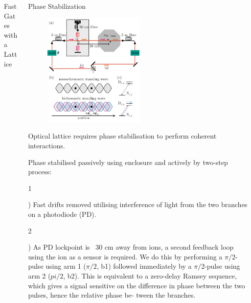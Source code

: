 \documentclass[final]{beamer}
\newcommand{\SubItem}[1]{
    {\setlength\itemindent{15pt} \item[] #1}
}
\begin{document}
\begin{frame}{}
\begin{center}
\begin{columns}[t]
\begin{column}{0.49\textwidth}
\begin{alertblock}{Fast Gates with a Lattice}
    \end{alertblock}

  \end{column}
  \begin{column}{0.49\textwidth}

    \begin{alertblock}{Phase Stabilization}

      \begin{figure}
        \includegraphics[width=0.5\textwidth]{./figs/setup+beams_horizontal.pdf}
      \end{figure}

      \begin{itemize}
      \item Optical lattice requires phase stabilisation to perform
            coherent interactions.\\
      \item Phase stabilised passively using enclosure and actively by two-step process:\\
      \SubItem 1) Fast drifts removed utilising interference of light
            from the two branches on a photodiode (PD).\\

      \SubItem 2) As PD lockpoint is ~30 cm away
            from ions, a second feedback loop using the ion as a
            sensor is required. We do this by performing a $\pi/2$-pulse
            using arm 1 ($\pi/2$, b1) followed immediately by a $\pi/2$-pulse
            using arm 2 ($pi/2$, b2). This is equivalent to a zero-delay
            Ramsey sequence, which gives a signal sensitive on the
            difference in phase between the two pulses, hence the
            relative phase be- tween the branches.\\


\end{itemize}
\end{alertblock}
\end{column}
\end{columns}
\end{center}
\end{frame}
\end{document}
